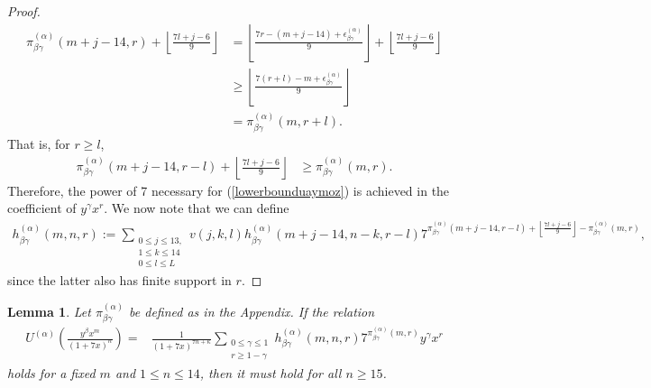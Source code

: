 \documentclass[reqno]{amsart}
\newtheorem{lemma}[theorem]{Lemma}
\theoremstyle{definition}
\theoremstyle{remark}
\numberwithin{equation}{section}
\begin{document}
\begin{proof}
\begin{align*}
\pi^{(\alpha)}_{\beta\gamma}(m+j-14,r)+\left\lfloor \frac{7l+j-6}{9} \right\rfloor &= \left\lfloor \frac{7r-(m+j-14)+\epsilon^{(\alpha)}_{\beta\gamma}}{9} \right\rfloor +\left\lfloor \frac{7l+j-6}{9} \right\rfloor\\
&\ge \left\lfloor \frac{7(r+l)-m+\epsilon^{(\alpha)}_{\beta\gamma}}{9} \right\rfloor\\
&= \pi^{(\alpha)}_{\beta\gamma}(m,r+l).
\end{align*}  That is, for $r\ge l$,
\begin{align*}
\pi^{(\alpha)}_{\beta\gamma}(m+j-14,r-l)+\left\lfloor \frac{7l+j-6}{9} \right\rfloor &\ge \pi^{(\alpha)}_{\beta\gamma}(m,r).
\end{align*}  Therefore, the power of 7 necessary for (\ref{lowerbounduaymoz}) is achieved in the coefficient of $y^{\gamma}x^r$.  We now note that we can define
\begin{align*}
h^{(\alpha)}_{\beta\gamma}(m,n,r):=\sum_{\substack{0\le j\le 13,\\ 1\le k\le 14\\ 0\le l\le L}}v(j,k,l) h^{(\alpha)}_{\beta\gamma}(m+j-14,n-k,r-l) 7^{\pi^{(\alpha)}_{\beta\gamma}(m+j-14,r-l)+\left\lfloor \frac{7l+j-6}{9} \right\rfloor - \pi^{(\alpha)}_{\beta\gamma}(m,r)},
\end{align*} since the latter also has finite support in $r$.
\end{proof}

\begin{lemma}\label{lowerboundpiabc0}
Let $\pi^{(\alpha)}_{\beta\gamma}$ be defined as in the Appendix.  If the relation
\begin{align}
U^{(\alpha)}\left( \frac{y^{\beta}x^{m}}{(1+7x)^{n}} \right) =& \frac{1}{(1+7x)^{7n+\kappa}}\sum_{\substack{0\le\gamma\le 1\\ r\ge 1-\gamma}} h^{(\alpha)}_{\beta\gamma}(m,n,r) 7^{\pi^{(\alpha)}_{\beta\gamma}(m,r)}y^{\gamma}x^r\label{adsfadaiie33}
\end{align} holds for a fixed $m$ and $1\le n\le 14$, then it must hold for all $n\ge 15$.
\end{lemma}
\end{document}
